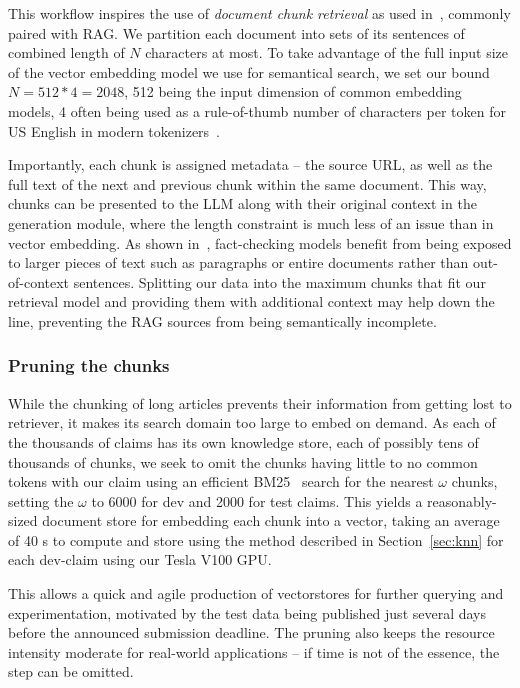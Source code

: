 This workflow inspires the use of \textit{document chunk retrieval} as used in~\cite{rag}, commonly paired with RAG.
We partition each document into sets of its sentences of combined length of $N$ characters at most.
To take advantage of the full input size of the vector embedding model we use for semantical search, we set our bound $N=512*4=2048$, 512 being the input dimension of common embedding models, 4 often being used as a rule-of-thumb number of characters per token for US English in modern tokenizers~\cite{tokens}.

Importantly, each chunk is  assigned metadata -- the source URL, as well as the full text of the next and previous chunk within the same document.
This way, chunks can be presented to the LLM along with their original context in the generation module, where the length constraint is much less of an issue than in vector embedding.
As shown in~\cite{drchal2023pipelinedatasetgenerationautomated}, fact-checking models benefit from being exposed to larger pieces of text such as paragraphs or entire documents rather than out-of-context sentences.
Splitting our data into the maximum chunks that fit our retrieval model and providing them with additional context may help down the line, preventing the RAG sources from being semantically incomplete.

\subsubsection{Pruning the chunks}
While the chunking of long articles prevents their information from getting lost to retriever, it makes its search domain too large to embed on demand.
As each of the thousands of claims has its own knowledge store, each of possibly tens of thousands of chunks, we seek to omit the chunks having little to no common tokens with our claim using an efficient BM25~\cite{bm25} search for the nearest $\omega$ chunks, setting the $\omega$ to 6000 for dev and 2000 for test claims. 
This yields a reasonably-sized document store for embedding each chunk into a vector, taking an average of 40 s to compute and store using the method described in Section~\ref{sec:knn} for each dev-claim using our Tesla V100 GPU.

This allows a quick and agile production of vectorstores for further querying and experimentation, motivated by the \averitec{}  test data being published just several days before the announced submission deadline.
The pruning also keeps the resource intensity moderate for real-world applications -- if time is not of the essence, the step can be omitted.

